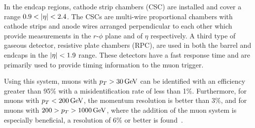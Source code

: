 In the endcap regions, cathode strip chambers (CSC) are installed and cover a range $0.9 < \lvert \eta \rvert < 2.4$. The CSCs are multi-wire proportional chambers with cathode strips and anode wires arranged perpendicular to each other which provide measurements in the $r$-$\phi$ plane and of $\eta$ respectively. A third type of gaseous detector, resistive plate chambers (RPC), are used in both the barrel and endcaps in the $\lvert \eta \rvert < 1.9$ range. These detectors have a fast response time and are primarily used to provide timing information to the muon trigger. 

Using this system, muons with $p_T > 30\,\text{Ge\hspace{-.08em}V}$ can be identified with an efficiency greater than 95\% with a misidentification rate of less than 1\%. Furthermore, for muons with $p_T < 200\,\text{Ge\hspace{-.08em}V}$, the momentum resolution is better than 3\%, and for muons with $200 > p_T > 1000\,\text{Ge\hspace{-.08em}V}$, where the addition of the muon system is especially beneficial, a resolution of 6\% or better is found~\cite{CMS:2018rym}.